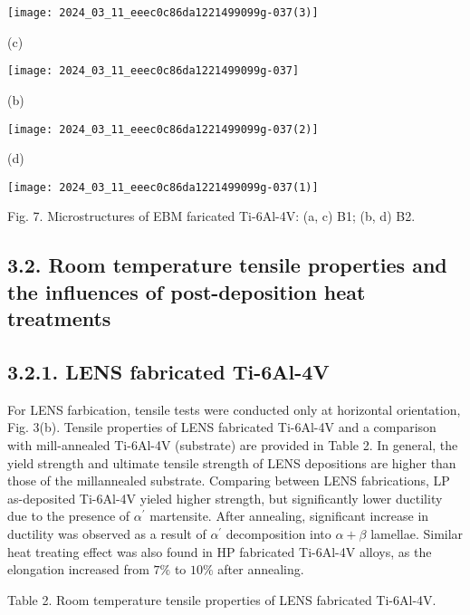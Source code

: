 \documentclass[10pt]{article}
\begin{document}
\begin{center}
\texttt{[image: 2024\_03\_11\_eeec0c86da1221499099g-037(3)]}
\end{center}

(c)

\begin{center}
\texttt{[image: 2024\_03\_11\_eeec0c86da1221499099g-037]}
\end{center}

(b)

\begin{center}
\texttt{[image: 2024\_03\_11\_eeec0c86da1221499099g-037(2)]}
\end{center}

(d)

\begin{center}
\texttt{[image: 2024\_03\_11\_eeec0c86da1221499099g-037(1)]}
\end{center}

Fig. 7. Microstructures of EBM faricated Ti-6Al-4V: (a, c) B1; (b, d) B2.

\subsection*{3.2. Room temperature tensile properties and the influences of post-deposition heat treatments}
\subsection*{3.2.1. LENS fabricated Ti-6Al-4V}
For LENS farbication, tensile tests were conducted only at horizontal orientation, Fig. 3(b). Tensile properties of LENS fabricated Ti-6Al-4V and a comparison with mill-annealed Ti-6Al-4V (substrate) are provided in Table 2. In general, the yield strength and ultimate tensile strength of LENS depositions are higher than those of the millannealed substrate. Comparing between LENS fabrications, LP as-deposited Ti-6Al-4V yieled higher strength, but significantly lower ductility due to the presence of $\alpha^{\prime}$ martensite. After annealing, significant increase in ductility was observed as a result of $\alpha^{\prime}$ decomposition into $\alpha+\beta$ lamellae. Similar heat treating effect was also found in HP fabricated Ti-6Al-4V alloys, as the elongation increased from $7 \%$ to $10 \%$ after annealing.

Table 2. Room temperature tensile properties of LENS fabricated Ti-6Al-4V.
\end{document}
